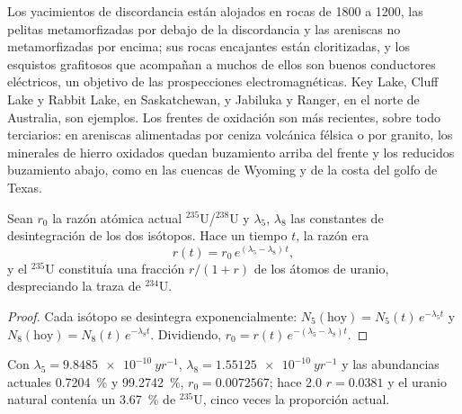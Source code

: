 Los yacimientos de discordancia están alojados en rocas de 1800 a \qty{1200}{\Ma}, las pelitas metamorfizadas
por debajo de la discordancia y las areniscas no metamorfizadas por encima; sus rocas encajantes están cloritizadas, y los esquistos grafitosos que
acompañan a muchos de ellos son buenos conductores eléctricos, un objetivo de las prospecciones electromagnéticas. Key
Lake, Cluff Lake y Rabbit Lake, en Saskatchewan, y Jabiluka y Ranger, en el norte de Australia, son
ejemplos. Los frentes de oxidación son más recientes, sobre todo terciarios: en areniscas alimentadas por ceniza volcánica félsica o por
granito, los minerales de hierro oxidados quedan buzamiento arriba del frente y los reducidos buzamiento abajo, como en las cuencas
de Wyoming y de la costa del golfo de Texas.

\begin{proposition}\label{prop:b2:energy-geology:u235}
Sean $r_0$ la razón atómica actual $^{235}$U/$^{238}$U y $\lambda_5$, $\lambda_8$ las constantes de
desintegración de los dos isótopos. Hace un tiempo $t$, la razón era
\begin{equation}
r(t) = r_0\,e^{(\lambda_5 - \lambda_8)\,t} ,
\label{eq:b2:energy-geology:u235}
\end{equation}
y el $^{235}$U constituía una fracción $r/(1 + r)$ de los átomos de uranio, despreciando la traza de
$^{234}$U.
\end{proposition}

\begin{proof}
Cada isótopo se desintegra exponencialmente: $N_5(\text{hoy}) = N_5(t)\,e^{-\lambda_5 t}$ y $N_8(\text{hoy})
= N_8(t)\,e^{-\lambda_8 t}$. Dividiendo, $r_0 = r(t)\,e^{-(\lambda_5 - \lambda_8)t}$.
\end{proof}

Con $\lambda_5 = \qty{9.8485e-10}{yr^{-1}}$, $\lambda_8 = \qty{1.55125e-10}{yr^{-1}}$ y las
abundancias actuales \qty{0.7204}{\percent} y \qty{99.2742}{\percent}, $r_0 = 0.0072567$; hace \qty{2.0}{\Ga}
$r = 0.0381$ y el uranio natural contenía un \qty{3.67}{\percent} de $^{235}$U, cinco veces la proporción
actual.

